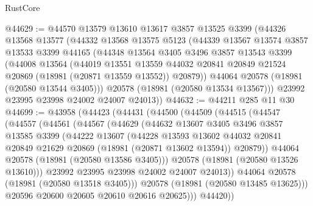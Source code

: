\begin{lexlean}{RustCore}
\begin{coremodule}
@44629 := @44570
    @13579
    @13610
    @13617
    @3857
    @13525
    @3399
    (@44326
      @13568
      @13577
      (@44332
        @13568
        @13575
        @5123
        (@44339
          @13567
          @13574
          @3857
          @13533
          @3399
          @44165
          (@44348
            @13564
            @3405
            @3496
            @3857
            @13543
            @3399
            (@44008
              @13564
              (@44019
                @13551
                @13559
                @44032
                @20841
                @20849
                @21524
                @20869
                (@18981 (@20871 @13559 @13552))
                @20879))
            @44064
            @20578
            (@18981 (@20580 @13544 @3405)))
          @20578
          (@18981 (@20580 @13534 @13567)))
        @23992
        @23995
        @23998
        @24002
        @24007
        @24013))
@44632 := @44211 @285 @11 @30
@44699 := @43958
    (@44423
      (@44431
        (@44500
          (@44509
            (@44515
              (@44547
                (@44557
                  (@44561
                    (@44567
                      (@44629
                        (@44632
                          @13607
                          @3405
                          @3496
                          @3857
                          @13585
                          @3399
                          (@44222
                            @13607
                            (@44228
                              @13593
                              @13602
                              @44032
                              @20841
                              @20849
                              @21629
                              @20869
                              (@18981 (@20871 @13602 @13594))
                              @20879))
                          @44064
                          @20578
                          (@18981 (@20580 @13586 @3405)))
                        @20578
                        (@18981 (@20580 @13526 @13610)))
                      @23992
                      @23995
                      @23998
                      @24002
                      @24007
                      @24013))
                  @44064
                  @20578
                  (@18981 (@20580 @13518 @3405)))
                @20578
                (@18981 (@20580 @13485 @13625)))
              @20596
              @20600
              @20605
              @20610
              @20616
              @20625)))
        @44420))

\end{coremodule}
\end{lexlean}
